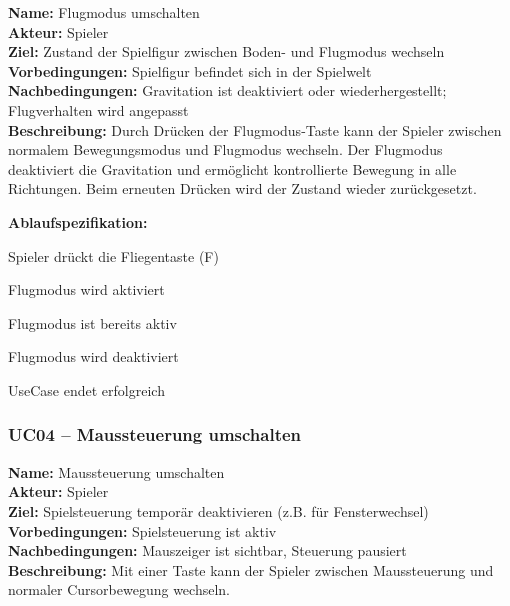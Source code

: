 \documentclass{article}
\begin{document}
\textbf{Name:} Flugmodus umschalten \\
\textbf{Akteur:} Spieler \\
\textbf{Ziel:} Zustand der Spielfigur zwischen Boden- und Flugmodus wechseln \\
\textbf{Vorbedingungen:} Spielfigur befindet sich in der Spielwelt \\
\textbf{Nachbedingungen:} Gravitation ist deaktiviert oder wiederhergestellt; Flugverhalten wird angepasst \\
\textbf{Beschreibung:} Durch Drücken der Flugmodus-Taste kann der Spieler zwischen normalem Bewegungsmodus und Flugmodus wechseln. Der Flugmodus deaktiviert die Gravitation und ermöglicht kontrollierte Bewegung in alle Richtungen. Beim erneuten Drücken wird der Zustand wieder zurückgesetzt.

\textbf{Ablaufspezifikation:}
\begin{description}[style=nextline,leftmargin=1.9cm,labelwidth=1.6cm]
  \item[1.] Spieler drückt die Fliegentaste (F)
  \item[2.] Flugmodus wird aktiviert
  \item[2a.] Flugmodus ist bereits aktiv
  \item[2a.1.] Flugmodus wird deaktiviert
  \item[3.] UseCase endet erfolgreich
\end{description}

\subsubsection*{UC04 – Maussteuerung umschalten}

\textbf{Name:} Maussteuerung umschalten \\
\textbf{Akteur:} Spieler \\
\textbf{Ziel:} Spielsteuerung temporär deaktivieren (z.B. für Fensterwechsel) \\
\textbf{Vorbedingungen:} Spielsteuerung ist aktiv \\
\textbf{Nachbedingungen:} Mauszeiger ist sichtbar, Steuerung pausiert \\
\textbf{Beschreibung:} Mit einer Taste kann der Spieler zwischen Maussteuerung und normaler Cursorbewegung wechseln.
\end{document}
